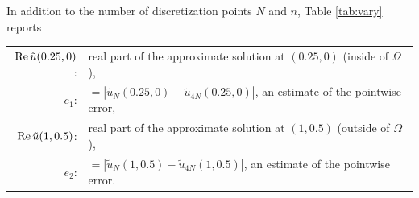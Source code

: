 \documentclass[11pt,final]{amsart}
\theoremstyle{definition}
\numberwithin{remark}{section}
\numberwithin{definition}{section}
\numberwithin{pro}{section}
\begin{document}
In addition to the number of discretization points $N$ and $n$, Table \ref{tab:vary} reports

\vspace{.5ex}
\begin{tabular}{rl}
$\operatorname{Re}\tilde{u}(0.25,0)$:& real part of the approximate solution at $(0.25,0)$ (inside of $\Omega$),\\
 $e_1$:& $=|\tilde{u}_N(0.25,0)-\tilde{u}_{4N}(0.25,0)|$, an estimate of the pointwise error,\\
$\operatorname{Re}\tilde{u}(1,0.5)$:& real part of the approximate solution at $(1,0.5)$ (outside of $\Omega$),\\
$e_2$:&   $=|\tilde{u}_N(1,0.5)-\tilde{u}_{4N}(1,0.5)|$, an estimate of the pointwise error.\\
\end{tabular}
\vspace{.5ex}
\end{document}
